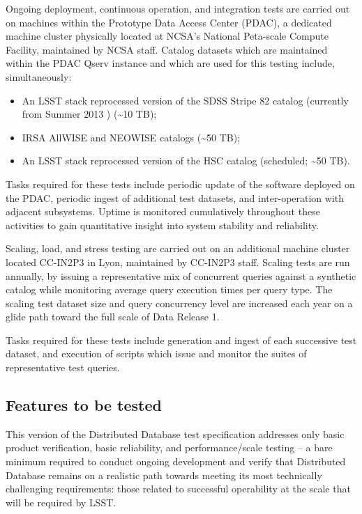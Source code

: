 \documentclass[DM,lsstdraft,STS,toc]{lsstdoc}
\def\product{Distributed Database}
\begin{document}
Ongoing deployment, continuous operation, and integration tests are carried out on machines within the
Prototype \gls{Data Access Center} (\gls{PDAC}), a dedicated machine cluster physically located at \gls{NCSA}'s National
Peta-scale Compute Facility, maintained by \gls{NCSA} staff. Catalog datasets which are maintained within
the \gls{PDAC} \gls{Qserv} instance and which are used for this testing include, simultaneously:

\begin{itemize}
  \item{An \gls{LSST} \gls{stack} reprocessed version of the \gls{SDSS} \gls{Stripe 82} catalog (currently from Summer 2013 ) ({\textasciitilde{}}10 \gls{TB});}
  \item{IRSA AllWISE and NEOWISE catalogs ({\textasciitilde{}}50 \gls{TB});}
  \item{An \gls{LSST} \gls{stack} reprocessed version of the \gls{HSC} catalog (scheduled; {\textasciitilde{}}50 \gls{TB}).}
\end{itemize}

Tasks required for these tests include periodic update of the software deployed on the \gls{PDAC},
periodic ingest of additional test datasets, and inter-operation with adjacent subsystems.  Uptime
is monitored cumulatively throughout these activities to gain quantitative insight into system
stability and reliability.

Scaling, load, and stress testing are carried out on an additional machine cluster located
CC-IN2P3 in Lyon, maintained by CC-IN2P3 staff. Scaling tests are run annually, by issuing
a representative mix of concurrent queries against a synthetic catalog while monitoring
average query execution times per query type.  The scaling test dataset size and query
concurrency level are increased each year on a glide path toward the full scale of \gls{Data Release} 1.

Tasks required for these tests include generation and ingest of each successive test dataset, and
execution of scripts which issue and monitor the suites of representative test queries.

\subsection{Features to be tested}
\label{sec:feat2test}

This version of the \product{} test specification addresses only basic product verification, basic
reliability, and performance/scale testing -- a bare minimum required to conduct ongoing development
and verify that \product{} remains on a realistic path towards meeting its most technically challenging
requirements: those related to successful operability at the scale that will be required by \gls{LSST}.
\end{document}
